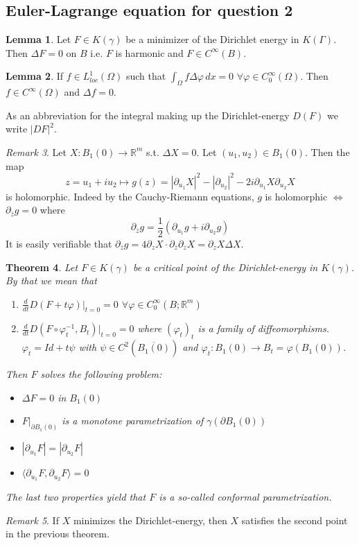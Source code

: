 \documentclass[a4paper, 12pt]{article}
\theoremstyle{plain}
\newtheorem{theorem}{Theorem}[section] %
\theoremstyle{definition}
\theoremstyle{lemma}
\newtheorem{lemma}[theorem]{Lemma}
\theoremstyle{remark}
\newtheorem{remark}[theorem]{Remark}
\theoremstyle{corollary}
\theoremstyle{example}
\begin{document}
	\subsection{Euler-Lagrange equation for question 2}
	\begin{lemma}
		Let $F \in K(\gamma)$ be a minimizer of the Dirichlet energy in $K(\Gamma)$. Then $\Delta F = 0$ on $B$ i.e. $F$ is harmonic and $F \in C^\infty(B)$.
	\end{lemma}
	\begin{lemma}
		If $f \in L^1_{loc}(\Omega)$ such that $\int_\Omega f \Delta \varphi \, dx = 0$ $\forall \varphi \in C_0^\infty(\Omega)$. Then $f \in C^\infty(\Omega)$ and $\Delta f = 0$.
	\end{lemma}
	As an abbreviation for the integral making up the Dirichlet-energy $D(F)$ we write $\left|DF\right|^2$.
	\begin{remark}
		Let $X: B_1(0) \to \mathbb{R}^m$ s.t. $\Delta X = 0$. Let $(u_1,u_2) \in B_1(0)$. Then the map \[z = u_1 + iu_2 \mapsto g(z) = \left|\partial_{u_1} X\right|^2 - \left|\partial_{u_2}\right|^2 - 2i \partial_{u_1} X \partial_{u_2}X\] is holomorphic. Indeed by the Cauchy-Riemann equations, $g$ is holomorphic $\iff$ $\partial_{\overline{z}} g = 0$ where \[\partial_{\overline{z}} g = \frac{1}{2}\left(\partial_{u_1}g + i \partial_{u_2}g\right)\]  
		It is easily verifiable that $\partial_{\overline{z}} g = 4 \partial_z X \cdot \partial_{\overline{z}} \partial_z X = \partial_z X \Delta X$.
	\end{remark}
	\begin{theorem}
		Let $F \in K(\gamma)$ be a critical point of the Dirichlet-energy in $K(\gamma)$. By that we mean that \begin{enumerate}
			\item $\frac{d}{dt} D(F+t\varphi)|_{t=0} = 0$ $\forall \varphi \in C_0^\infty(B;\mathbb{R}^m)$
			\item $\frac{d}{dt} D(F\circ \varphi^{-1}_t, B_t)|_{t=0} = 0$ where $(\varphi_t)_t$ is a family of diffeomorphisms. $\varphi_t = Id + t\psi$ with $\psi \in C^2(\overline{B_1(0)})$ and $\varphi_t: B_1(0) \to B_t = \varphi(B_1(0))$.
		\end{enumerate}
		Then $F$ solves the following problem:
		\begin{itemize}
			\item $\Delta F = 0$ in $B_1(0)$
			\item $F|_{\partial B_1(0)}$ is a monotone parametrization of $\gamma(\partial B_1(0))$
			\item $\left|\partial_{u_1} F\right| = \left|\partial_{u_2} F\right|$
			\item $\langle \partial_{u_1} F, \partial_{u_2} F \rangle = 0$
		\end{itemize}
		The last two properties yield that $F$ is a so-called conformal parametrization.
	\end{theorem}
	\begin{remark}
		If $X$ minimizes the Dirichlet-energy, then $X$ satisfies the second point in the previous theorem.
	\end{remark}
	
\end{document}
